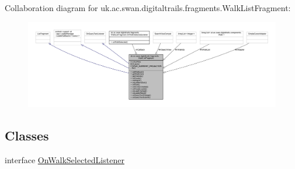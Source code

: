 Collaboration diagram for uk.\+ac.\+swan.\+digitaltrails.\+fragments.\+Walk\+List\+Fragment\+:
\nopagebreak
\begin{figure}[H]
\begin{center}
\leavevmode
\includegraphics[width=350pt]{classuk_1_1ac_1_1swan_1_1digitaltrails_1_1fragments_1_1_walk_list_fragment__coll__graph}
\end{center}
\end{figure}
\subsection*{Classes}
\begin{DoxyCompactItemize}
\item 
interface \hyperlink{interfaceuk_1_1ac_1_1swan_1_1digitaltrails_1_1fragments_1_1_walk_list_fragment_1_1_on_walk_selected_listener}{On\+Walk\+Selected\+Listener}
\end{DoxyCompactItemize}

